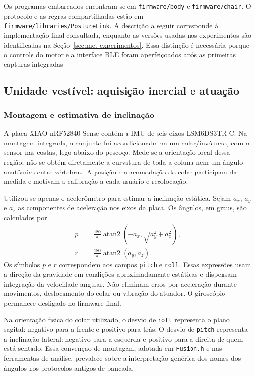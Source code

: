 Os programas embarcados encontram-se em \texttt{firmware/body} e
\texttt{firmware/chair}. O protocolo e as regras compartilhadas estão em
\texttt{firmware/libraries/PostureLink}. A descrição a seguir corresponde
à implementação final consultada, enquanto as versões usadas nos
experimentos são identificadas na Seção~\ref{sec:met-experimentos}.
Essa distinção é necessária porque o controle do motor e a interface BLE
foram aperfeiçoados após as primeiras capturas integradas.

\subsection{Unidade vestível: aquisição inercial e atuação}
\label{sec:met-corpo}

\subsubsection{Montagem e estimativa de inclinação}

A placa XIAO nRF52840 Sense contém a IMU de seis eixos LSM6DS3TR-C. Na
montagem integrada, o conjunto foi acondicionado em um colar/invólucro,
com o sensor nas costas, logo abaixo do pescoço. Mede-se a orientação
local dessa região; não se obtém diretamente a curvatura de toda a coluna
nem um ângulo anatômico entre vértebras. A posição e a acomodação do
colar participam da medida e motivam a calibração a cada usuário e
recolocação.

Utilizou-se apenas o acelerômetro para estimar a inclinação estática.
Sejam $a_x$, $a_y$ e $a_z$ as componentes de aceleração nos eixos da placa.
Os ângulos, em graus, são calculados por
\begin{align}
 p &= \frac{180}{\pi}\operatorname{atan2}
       \left(-a_x,\sqrt{a_y^2+a_z^2}\right),
       \label{eq:met-pitch}\\
 r &= \frac{180}{\pi}\operatorname{atan2}(a_y,a_z).
       \label{eq:met-roll}
\end{align}
Os símbolos $p$ e $r$ correspondem aos campos \texttt{pitch} e
\texttt{roll}. Essas expressões usam a direção da gravidade em condições
aproximadamente estáticas e dispensam integração da velocidade angular.
Não eliminam erros por aceleração durante movimentos, deslocamento do
colar ou vibração do atuador. O giroscópio permanece desligado no
firmware final.

Na orientação física do colar utilizado, o desvio de \texttt{roll}
representa o plano sagital: negativo para a frente e positivo para trás.
O desvio de \texttt{pitch} representa a inclinação lateral: negativo para
a esquerda e positivo para a direita de quem está sentado. Essa
convenção de montagem, adotada em \texttt{Fusion.h} e nas ferramentas de
análise, prevalece sobre a interpretação genérica dos nomes dos ângulos
nos protocolos antigos de bancada.

